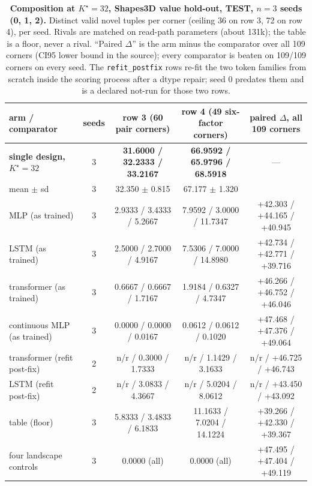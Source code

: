 \documentclass{article} %
\newcommand{\Kstar}{\ensuremath{K^{\star}}}
\begin{document}
\begin{table}[t]
\centering\small
\caption{\textbf{Composition at $\Kstar=32$, Shapes3D value hold-out, TEST, $n=3$ seeds
(0, 1, 2).} Distinct valid novel tuples per corner (ceiling 36 on row 3, 72 on row 4), per
seed. Rivals are matched on read-path parameters (about 131k); the table is a floor, never a
rival. ``Paired $\Delta$'' is the arm minus the comparator over all 109 corners (CI95 lower
bound in the source); every comparator is beaten on 109/109 corners on every seed. The
\texttt{refit\_postfix} rows re-fit the two token families from scratch inside the scoring
process after a dtype repair; seed 0 predates them and is a declared not-run for those two
rows.}
\label{tab:t7}
\setlength{\tabcolsep}{3.2pt}
\begin{tabular}{lcccc}
\toprule
arm / comparator & seeds & row 3 (60 pair corners) & row 4 (49 six-factor corners) & paired $\Delta$, all 109 corners \\
\midrule
\textbf{single design, $\Kstar=32$} & 3 & \textbf{31.6000 / 32.2333 / 33.2167} & \textbf{66.9592 / 65.9796 / 68.5918} & --- \\
\quad mean $\pm$ sd & 3 & 32.350 $\pm$ 0.815 & 67.177 $\pm$ 1.320 & \\
MLP (as trained) & 3 & 2.9333 / 3.4333 / 5.2667 & 7.9592 / 3.0000 / 11.7347 & +42.303 / +44.165 / +40.945 \\
LSTM (as trained) & 3 & 2.5000 / 2.7000 / 4.9167 & 7.5306 / 7.0000 / 14.8980 & +42.734 / +42.771 / +39.716 \\
transformer (as trained) & 3 & 0.6667 / 0.6667 / 1.7167 & 1.9184 / 0.6327 / 4.7347 & +46.266 / +46.752 / +46.046 \\
continuous MLP (as trained) & 3 & 0.0000 / 0.0000 / 0.0167 & 0.0612 / 0.0612 / 0.1020 & +47.468 / +47.376 / +49.064 \\
transformer (refit post-fix) & 2 & n/r / 0.3000 / 1.7333 & n/r / 1.1429 / 3.1633 & n/r / +46.725 / +46.743 \\
LSTM (refit post-fix) & 2 & n/r / 3.0833 / 4.3667 & n/r / 5.0204 / 8.0612 & n/r / +43.450 / +43.092 \\
table (floor) & 3 & 5.8333 / 3.4833 / 6.1833 & 11.1633 / 7.0204 / 14.1224 & +39.266 / +42.330 / +39.367 \\
\midrule
four landscape controls & 3 & 0.0000 (all) & 0.0000 (all) & +47.495 / +47.404 / +49.119 \\
\bottomrule
\end{tabular}
\end{table}
\end{document}
